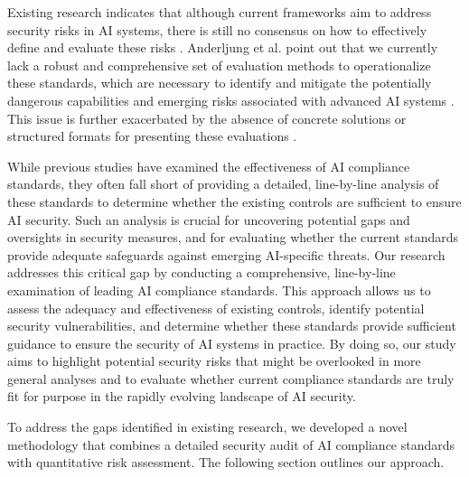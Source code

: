 Existing research indicates that although current frameworks aim to address security risks in AI systems, there is still no consensus on how to effectively define and evaluate these risks \cite{Steimers2022SourcesSystems, MartinezStudyAI}. Anderljung et al. point out that we currently lack a robust and comprehensive set of evaluation methods to operationalize these standards, which are necessary to identify and mitigate the potentially dangerous capabilities and emerging risks associated with advanced AI systems \cite{Anderljung2023FRONTIERSAFETY}. This issue is further exacerbated by the absence of concrete solutions or structured formats for presenting these evaluations \cite{Goldsteen2022AnModels, Kazim2020AFramework}.

While previous studies have examined the effectiveness of AI compliance standards, they often fall short of providing a detailed, line-by-line analysis of these standards to determine whether the existing controls are sufficient to ensure AI security. Such an analysis is crucial for uncovering potential gaps and oversights in security measures, and for evaluating whether the current standards provide adequate safeguards against emerging AI-specific threats. Our research addresses this critical gap by conducting a comprehensive, line-by-line examination of leading AI compliance standards. This approach allows us to assess the adequacy and effectiveness of existing controls, identify potential security vulnerabilities, and determine whether these standards provide sufficient guidance to ensure the security of AI systems in practice. By doing so, our study aims to highlight potential security risks that might be overlooked in more general analyses and to evaluate whether current compliance standards are truly fit for purpose in the rapidly evolving landscape of AI security.

To address the gaps identified in existing research, we developed a novel methodology that combines a detailed security audit of AI compliance standards with quantitative risk assessment. The following section outlines our approach.